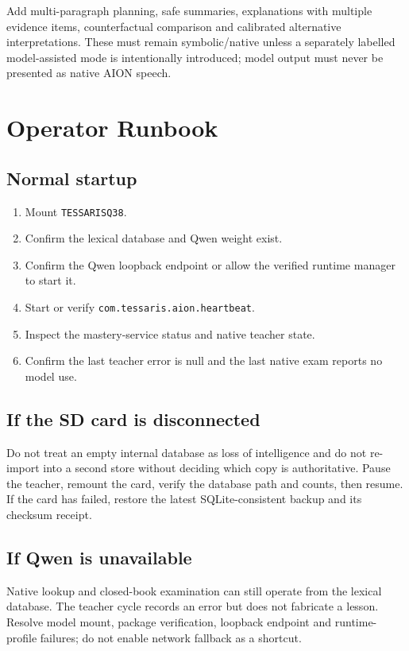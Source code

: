 \documentclass[11pt,a4paper]{article}
\begin{document}
Add multi-paragraph planning, safe summaries, explanations with multiple evidence items,
counterfactual comparison and calibrated alternative interpretations. These must remain
symbolic/native unless a separately labelled model-assisted mode is intentionally introduced;
model output must never be presented as native AION speech.

\section{Operator Runbook}

\subsection{Normal startup}

\begin{enumerate}
  \item Mount \texttt{TESSARISQ38}.
  \item Confirm the lexical database and Qwen weight exist.
  \item Confirm the Qwen loopback endpoint or allow the verified runtime manager to start it.
  \item Start or verify \texttt{com.tessaris.aion.heartbeat}.
  \item Inspect the mastery-service status and native teacher state.
  \item Confirm the last teacher error is null and the last native exam reports no model use.
\end{enumerate}

\subsection{If the SD card is disconnected}

Do not treat an empty internal database as loss of intelligence and do not re-import into a
second store without deciding which copy is authoritative. Pause the teacher, remount the card,
verify the database path and counts, then resume. If the card has failed, restore the latest
SQLite-consistent backup and its checksum receipt.

\subsection{If Qwen is unavailable}

Native lookup and closed-book examination can still operate from the lexical database. The
teacher cycle records an error but does not fabricate a lesson. Resolve model mount, package
verification, loopback endpoint and runtime-profile failures; do not enable network fallback
as a shortcut.
\end{document}
